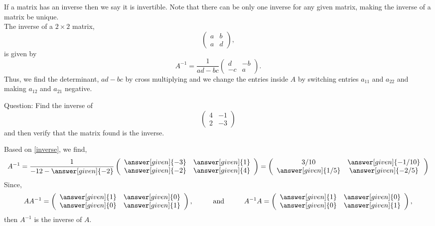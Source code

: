 \documentclass{ximera}
\begin{document}
If a matrix has an inverse then we say it is invertible. Note that there can be only one inverse for any given matrix, making the inverse of a matrix be unique. \\
The inverse of a $2\times 2$ matrix,
\[ \left(\begin{array}{cc}
  a & b  \\
  a &  d
\end{array}\right),
\]
is given by
\[
A^{-1}=  \frac{1}{ad-bc} \left(\begin{array}{cc}
  d & -b  \\
  -c &  a
\end{array}\right).
\]
Thus, we find the determinant, $ad-bc$ by cross multiplying and we change the entries inside $A$ by switching entries $a_{11}$ and $a_{22}$ and making $a_{12}$ and $a_{21}$ negative.

Question: Find the inverse of
\[ \left(\begin{array}{cc}
  4 & -1 \\
  2 & -3
\end{array}\right)
\]
and then verify that the matrix found is the inverse.
\begin{prompt}
Based on \eqref{inverse}, we find,
\[
A^{-1}=  \frac{1}{-12-\answer[given]{-2}} \left(\begin{array}{cc}
  \answer[given]{-3} &  \answer[given]{1} \\
  \answer[given]{-2} &  \answer[given]{4}
\end{array}\right)= \left(\begin{array}{cc}
  3/10 &  \answer[given]{-1/10} \\
  \answer[given]{1/5} &  \answer[given]{-2/5}
\end{array}\right)
\]
Since,
\[
AA^{-1}= \left(\begin{array}{cc}
  \answer[given]{1} &  \answer[given]{0} \\
  \answer[given]{0} &  \answer[given]{1}
\end{array}\right), \hspace{1cm} \text{and} \hspace{1cm}
A^{-1}A= \left(\begin{array}{cc}
  \answer[given]{1} &  \answer[given]{0} \\
  \answer[given]{0} &  \answer[given]{1}
\end{array}\right),
\]
then $A^{-1}$ is the inverse of $A$.
\end{prompt}
\end{document}
